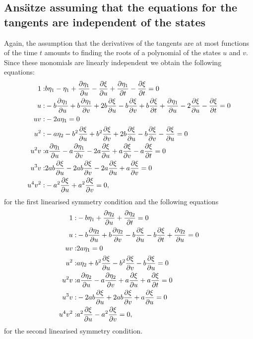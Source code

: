\subsection{Ans\"atze assuming that the equations for the tangents are independent of the states}
Again, the assumption that the derivatives of the tangents are at most functions of the time $t$ amounts to finding the roots of a polynomial of the states $u$ and $v$. Since these monomials are linearly independent we obtain the following equations:
\begin{align}
1:&b \eta_1 - \eta_1 + \pdv{\eta_1}{u} - \pdv{\xi}{u} + \pdv{\eta_1}{t} - \pdv{\xi}{t}=0\\
u:&- b \pdv{\eta_1}{u} + b \pdv{\eta_1}{v} + 2 b \pdv{\xi}{u} - b \pdv{\xi}{v} + b \pdv{\xi}{t} + \pdv{\eta_1}{u} - 2 \pdv{\xi}{u} - \pdv{\xi}{t}=0\\
u v:&- 2 a \eta_1=0\\
u^{2}:&- a \eta_2 - b^{2} \pdv{\xi}{u} + b^{2} \pdv{\xi}{v} + 2 b \pdv{\xi}{u} - b \pdv{\xi}{v} - \pdv{\xi}{u}=0\\
u^{2} v:&a \pdv{\eta_1}{u} - a \pdv{\eta_1}{v} - 2 a \pdv{\xi}{u} + a \pdv{\xi}{v} - a \pdv{\xi}{t}=0\\
u^{3} v:&2 a b \pdv{\xi}{u} - 2 a b \pdv{\xi}{v} - 2 a \pdv{\xi}{u} + a \pdv{\xi}{v}=0\\
u^{4} v^{2}:&- a^{2} \pdv{\xi}{u} + a^{2} \pdv{\xi}{v}=0,
\end{align}
for the first linearised symmetry condition and the following equations
\begin{align}
1:&- b \eta_1 + \pdv{\eta_2}{u} + \pdv{\eta_2}{t}=0\\
u:&- b \pdv{\eta_2}{u} + b \pdv{\eta_2}{v} - b \pdv{\xi}{u} - b \pdv{\xi}{t} + \pdv{\eta_2}{u}=0\\
u v:&2 a \eta_1=0\\
u^{2}:&a \eta_2 + b^{2} \pdv{\xi}{u} - b^{2} \pdv{\xi}{v} - b \pdv{\xi}{u}=0\\
u^{2} v:&a \pdv{\eta_2}{u} - a \pdv{\eta_2}{v} + a \pdv{\xi}{u} + a \pdv{\xi}{t}=0\\
u^{3} v:&- 2 a b \pdv{\xi}{u} + 2 a b \pdv{\xi}{v} + a \pdv{\xi}{u}=0\\
u^{4} v^{2}:&a^{2} \pdv{\xi}{u} - a^{2} \pdv{\xi}{v}=0,
\end{align}
for the second linearised symmetry condition.